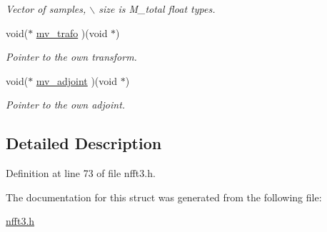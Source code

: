 \begin{CompactItemize}
\begin{CompactList}\small\item\em Vector of samples, $\backslash$ size is M\_\-total float types. \item\end{CompactList}\item 
\hypertarget{structmv__plan__double_d4a8d7d59be330c9b02139da94838675}{
void($\ast$ \hyperlink{structmv__plan__double_d4a8d7d59be330c9b02139da94838675}{mv\_\-trafo} )(void $\ast$)}
\label{structmv__plan__double_d4a8d7d59be330c9b02139da94838675}

\begin{CompactList}\small\item\em Pointer to the own transform. \item\end{CompactList}\item 
\hypertarget{structmv__plan__double_2385d21bb6eeefb51c03f615442f3df0}{
void($\ast$ \hyperlink{structmv__plan__double_2385d21bb6eeefb51c03f615442f3df0}{mv\_\-adjoint} )(void $\ast$)}
\label{structmv__plan__double_2385d21bb6eeefb51c03f615442f3df0}

\begin{CompactList}\small\item\em Pointer to the own adjoint. \item\end{CompactList}\end{CompactItemize}


\subsection{Detailed Description}


Definition at line 73 of file nfft3.h.

The documentation for this struct was generated from the following file:\begin{CompactItemize}
\item 
\hyperlink{nfft3_8h}{nfft3.h}\end{CompactItemize}
